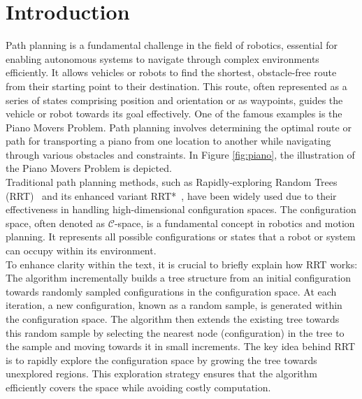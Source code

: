 \documentclass{ctuthesis}
\begin{document}
% 
\maketitle


 
\chapter{Introduction}
\label{chap:Introduction}
Path planning is a fundamental challenge in the field of robotics, 
essential for enabling autonomous systems to navigate through complex environments efficiently. 
It allows vehicles or robots to find the shortest, 
obstacle-free route from their starting point to their destination.
This route, often represented as a series of states comprising position and orientation or as waypoints, 
guides the vehicle or robot towards its goal effectively. 
One of the famous examples is the Piano Movers Problem.
Path planning involves determining the optimal route or path for transporting a 
piano from one location to another while navigating through various obstacles and constraints. 
In Figure \ref{fig:piano}, the illustration of the Piano Movers Problem is depicted.\\[12pt]
Traditional path planning methods, such as Rapidly-exploring Random Trees (RRT)~\cite{lavalle1998rapidly} 
and its enhanced variant RRT*~\cite{karaman2011rrtstar}, 
have been widely used due to their effectiveness in handling high-dimensional configuration spaces.  
The configuration space, often denoted as $\mathcal{C}$-space, is a fundamental concept in robotics and motion planning. 
It represents all possible configurations or states that a robot or system can occupy within its environment.\\[12pt]
To enhance clarity within the text, it is crucial to briefly explain how RRT works: 
The algorithm incrementally builds a tree structure from an initial configuration towards randomly sampled configurations in the configuration space.
At each iteration, a new configuration, known as a random sample, is generated within the configuration space. 
The algorithm then extends the existing tree towards this random sample by selecting the nearest node (configuration) in the tree to the sample and moving towards it in small increments.
The key idea behind RRT is to rapidly explore the configuration space by growing the tree towards unexplored regions. 
This exploration strategy ensures that the algorithm efficiently covers the space while avoiding costly computation.
\end{document}
